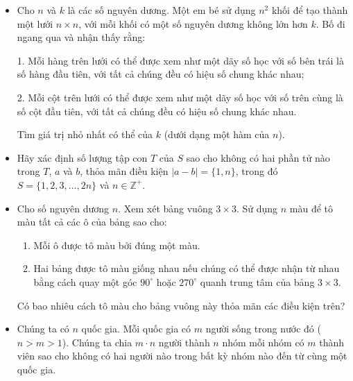 \documentclass[11pt]{scrartcl}
\begin{document}
\begin{itemize}[label=, leftmargin=0em, itemsep=0.5em]
\begin{btvn}
    \end{btvn}
    \item \begin{btvn}
        Cho \( n \) và \( k \) là các số nguyên dương. Một em bé sử dụng \( n^2 \) khối để tạo thành một lưới \( n \times n \), với mỗi khối có một số nguyên dương không lớn hơn \( k \). Bố đi ngang qua và nhận thấy rằng:

        1. Mỗi hàng trên lưới có thể được xem như một dãy số học với số bên trái là số hàng đầu tiên, với tất cả chúng đều có hiệu số chung khác nhau;
        
        2. Mỗi cột trên lưới có thể được xem như một dãy số học với số trên cùng là số cột đầu tiên, với tất cả chúng đều có hiệu số chung khác nhau.

        Tìm giá trị nhỏ nhất có thể của \( k \) (dưới dạng một hàm của \( n \)).

    \end{btvn}
    \item \begin{btvn}
        Hãy xác định số lượng tập con $T$ của $S$ sao cho không có hai phần tử nào trong $T$, $a$ và $b$, thỏa mãn điều kiện $|a-b|=\{1,n\}$, trong đó $S =\{1,2,3, \ldots, 2n\}$ và $n \in \mathbb{Z}^+$.
    \end{btvn}

    \item \begin{btvn}
        Cho số nguyên dương $n$. Xem xét bảng vuông $3 \times 3$. Sử dụng $n$ màu để tô màu tất cả các ô của bảng sao cho:
        \begin{enumerate}
            \item Mỗi ô được tô màu bởi đúng một màu.
            \item Hai bảng được tô màu giống nhau nếu chúng có thể được nhận từ nhau bằng cách quay một góc $90^\circ$ hoặc $270^\circ$ quanh trung tâm của bảng $3 \times 3$.
        \end{enumerate}
    Có bao nhiêu cách tô màu cho bảng vuông này thỏa mãn các điều kiện trên?
    \end{btvn}

    \item \begin{btvn}
        Chúng ta có $n$ quốc gia. Mỗi quốc gia có $m$ người sống trong nước đó ($n>m>1$). Chúng ta chia $m \cdot n$ người thành $n$ nhóm mỗi nhóm có $m$ thành viên sao cho không có hai người nào trong bất kỳ nhóm nào đến từ cùng một quốc gia.



\end{btvn}
\end{itemize}
\end{document}
